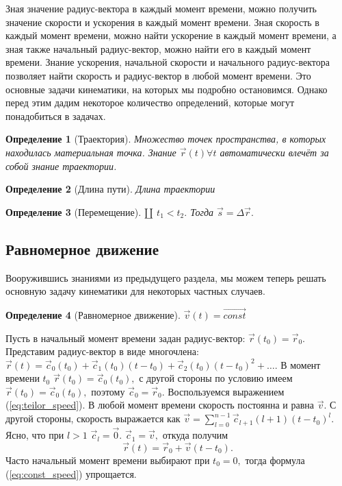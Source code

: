 \documentclass[a5paper,11pt]{article}
\newtheorem{definition}{Определение}
\begin{document}
Зная значение радиус-вектора в каждый момент времени, можно получить значение скорости
и ускорения в каждый момент времени. Зная скорость в каждый момент времени, можно
найти ускорение в каждый момент времени, а зная также начальный радиус-вектор, можно найти
его в каждый момент времени. Знание ускорения, начальной скорости и начального радиус-вектора
позволяет найти скорость и радиус-вектор в любой момент времени. Это основные задачи
кинематики, на которых мы подробно остановимся. Однако перед этим дадим некоторое количество
определений, которые могут понадобиться в задачах.
\begin{definition}[Траектория]
Множество точек пространства, в которых находилась материальная точка.
Знание $\vec{r}(t) \forall t$ автоматически влечёт за собой знание
траектории.
\end{definition}
\begin{definition}[Длина пути]
Длина траектории
\end{definition}
\begin{definition}[Перемещение]
$\amalg$ $t_1 < t_2.$ Тогда $\vec{s} = \Delta {\vec{r}}.$
\end{definition}
\subsection{Равномерное движение}
Вооружившись знаниями из предыдущего раздела, мы можем теперь решать основную задачу кинематики
для некоторых частных случаев.
\begin{definition}[Равномерное движение] $\vec{v}(t) = \overrightarrow{const}$\end{definition}
Пусть в начальный момент времени задан радиус-вектор: $\vec{r}(t_0) = \vec{r}_0$.
Представим радиус-вектор в виде многочлена:
$\vec{r}(t) = \vec{c}_0(t_0) +\vec{c}_1(t_0) (t-t_0) + \vec{c}_2(t_0) (t-t_0)^2+\ldots.$
В момент времени $t_0$ $\vec{r}(t_0) = \vec{c}_0(t_0),$ с другой стороны по условию имеем
$\vec{r}(t_0) = \vec{c}_0 (t_0),$ поэтому $\vec{c}_0 = \vec{r}_0.$
Воспользуемся выражением (\ref{eq:teilor_speed}). В любой момент времени
скорость постоянна и равна $\vec{v}.$ С другой стороны, скорость выражается как
$\vec{v} = \sum\limits_{l=0}^{n-1}\vec{c}_{l+1}(l+1)(t-t_0)^{l}.$ Ясно, что
при $l>1$ $\vec{c}_l = \vec{0}.$ $\vec{c}_1=\vec{v},$ откуда получим
\begin{equation}
\vec{r} (t) = \vec{r}_0 + \vec{v}(t-t_0).
\label{eq:const_speed}
\end{equation}
Часто начальный момент времени выбирают при $t_0 = 0,$ тогда
формула (\ref{eq:const_speed}) упрощается.
\end{document}

